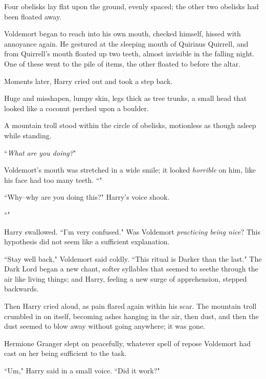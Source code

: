 Four obelisks lay flat upon the ground, evenly spaced; the other two obelisks had been floated away.

Voldemort began to reach into his own mouth, checked himself, hissed with annoyance again. He gestured at the sleeping mouth of Quirinus Quirrell, and from Quirrell's mouth floated up two teeth, almost invisible in the falling night. One of these went to the pile of items, the other floated to before the altar.

Moments later, Harry cried out and took a step back.

Huge and misshapen, lumpy skin, legs thick as tree trunks, a small head that looked like a coconut perched upon a boulder.

A mountain troll stood within the circle of obelisks, motionless as though asleep while standing.

``\emph{What are you doing?}"

Voldemort's mouth was stretched in a wide smile; it looked \emph{horrible} on him, like his face had too many teeth. ``"

``Why\---why are you doing this?" Harry's voice shook.

``"

Harry swallowed. ``I'm very confused." Was Voldemort \emph{practicing being nice}? This hypothesis did not seem like a sufficient explanation.

``Stay well back," Voldemort said coldly. ``This ritual is Darker than the last." The Dark Lord began a new chant, softer syllables that seemed to seethe through the air like living things; and Harry, feeling a new surge of apprehension, stepped backwards.

Then Harry cried aloud, as pain flared again within his scar. The mountain troll crumbled in on itself, becoming ashes hanging in the air, then dust, and then the dust seemed to blow away without going anywhere; it was gone.

Hermione Granger slept on peacefully, whatever spell of repose Voldemort had cast on her being sufficient to the task.

``Um," Harry said in a small voice. ``Did it work?"

